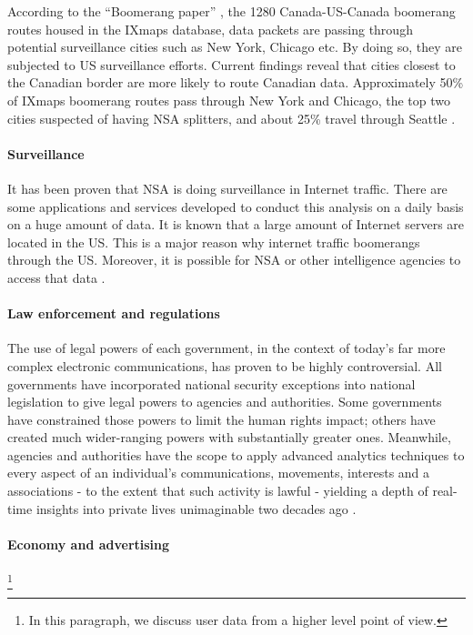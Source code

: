 According to the ``Boomerang paper'' \cite{obar2012internet}, the 1280 
Canada-US-Canada  boomerang routes housed in the IXmaps database, data packets 
are passing through potential surveillance cities such as New York, Chicago etc. 
By doing so, they are subjected  to US surveillance efforts. Current findings 
reveal that cities closest to the Canadian border are more likely to route 
Canadian data. Approximately 50\% of IXmaps boomerang routes pass  through  New  
York and Chicago, the top two cities suspected of having NSA splitters, and 
about 25\% travel through Seattle \cite{obar2012internet, naked}. 

\paragraph{Surveillance}

It has been proven that NSA is doing surveillance in Internet traffic. There are 
some applications and services developed to conduct this analysis on a daily 
basis on a huge amount of data. It is known that a large amount of Internet 
servers are located in the US. This is a major reason why internet traffic 
boomerangs through the US. Moreover, it is possible for NSA or other 
intelligence agencies to access that data \cite{clement2014nsa}.

\paragraph{Law enforcement and regulations}

The use of legal powers of each government, in the context of today's far more 
complex electronic communications, has proven to be highly controversial. All 
governments have incorporated national security exceptions into national 
legislation to give legal powers to agencies and authorities. Some governments 
have constrained those powers to limit the human rights impact; others have 
created much wider-ranging powers with substantially greater ones. Meanwhile, 
agencies and authorities have the scope to apply advanced analytics techniques 
to every aspect of an individual's communications, movements, interests and a
associations - to the extent that such activity is lawful - yielding a depth of 
real-time insights into private lives unimaginable two decades ago \cite{dark, 
vodafone}.

\paragraph{Economy and advertising}
\footnote{In this paragraph, we discuss user data from a higher level point of 
view.}

